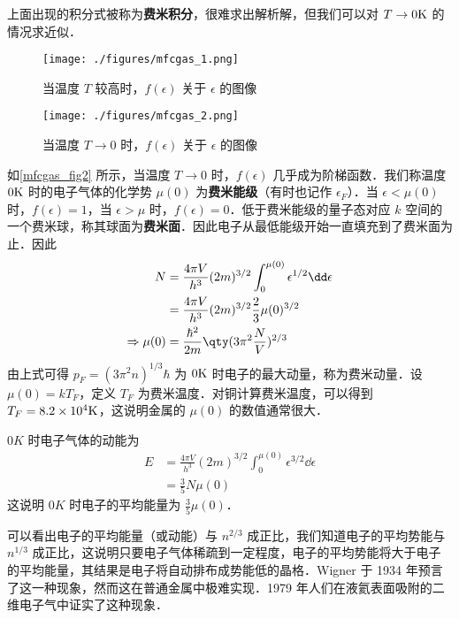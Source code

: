 上面出现的积分式被称为\textbf{费米积分}，很难求出解析解，但我们可以对 $T\rightarrow 0 \rm{K}$ 的情况求近似．
\begin{figure}[ht]
\centering
\texttt{[image: ./figures/mfcgas\_1.png]}
\caption{当温度 $T$ 较高时，$f(\epsilon )$ 关于 $\epsilon$ 的图像} \label{mfcgas_fig1}
\end{figure}
\begin{figure}[ht]
\centering
\texttt{[image: ./figures/mfcgas\_2.png]}
\caption{当温度 $T\rightarrow 0$ 时，$f(\epsilon )$ 关于 $\epsilon$ 的图像} \label{mfcgas_fig2}
\end{figure}

如\autoref{mfcgas_fig2} 所示，当温度 $T\rightarrow 0$ 时，$f(\epsilon)$ 几乎成为阶梯函数．我们称温度 $0\rm{K}$ 时的电子气体的化学势 $\mu(0)$ 为\textbf{费米能级}（有时也记作 $\epsilon_F$）．当 $\epsilon<\mu(0)$ 时，$f(\epsilon)=1$，当 $\epsilon>\mu$ 时，$f(\epsilon)=0$．低于费米能级的量子态对应 $k$ 空间的一个费米球，称其球面为\textbf{费米面}．因此电子从最低能级开始一直填充到了费米面为止．因此
\begin{equation}
\begin{aligned}
N&=\frac{4\pi V}{h^3}(2m)^{3/2}\int_0^{\mu(0)}\epsilon^{1/2}\dd \epsilon
\\
&=\frac{4\pi V}{h^3}(2m)^{3/2}\frac{2}{3}\mu(0)^{3/2}\\
\Rightarrow \mu(0)&=\frac{\hbar^2}{2m}\qty(3\pi^2\frac{N}{V})^{2/3}
\end{aligned}
\end{equation}
由上式可得 $p_F=(3\pi^2n)^{1/3}\hbar$ 为 $0\rm{K}$ 时电子的最大动量，称为费米动量．设 $\mu(0)=kT_F$，定义 $T_F$ 为费米温度．对铜计算费米温度，可以得到 $T_F=8.2\times 10^4 \rm{K}$，这说明金属的 $\mu(0)$ 的数值通常很大．

$0K$ 时电子气体的动能为
\begin{equation}
\begin{aligned}
E&=\frac{4\pi V}{h^3}(2m)^{3/2}\int_0^{\mu(0)} \epsilon^{3/2}\dd \epsilon\\
&=\frac{3}{5}N\mu(0)
\end{aligned}
\end{equation}
这说明 $0K$ 时电子的平均能量为 $\frac{3}{5}\mu(0)$．

可以看出电子的平均能量（或动能）与 $n^{2/3}$ 成正比，我们知道电子的平均势能与 $n^{1/3}$ 成正比，这说明只要电子气体稀疏到一定程度，电子的平均势能将大于电子的平均能量，其结果是电子将自动排布成势能低的晶格．Wigner 于 1934 年预言了这一种现象，然而这在普通金属中极难实现．1979 年人们在液氦表面吸附的二维电子气中证实了这种现象．


